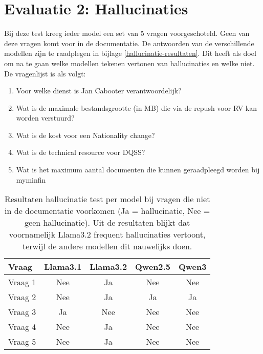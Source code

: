 \section{Evaluatie 2: Hallucinaties}

Bij deze test kreeg ieder model een set van 5 vragen voorgeschoteld. Geen van deze vragen komt voor in de documentatie. De antwoorden van de verschillende modellen zijn te raadplegen in bijlage \ref{hallucinatie-resultaten}. Dit heeft als doel om na te gaan welke modellen tekenen vertonen van hallucinaties en welke niet. 
\\[1em]
De vragenlijst is als volgt:

\begin{enumerate}
    \item Voor welke dienst is Jan Cabooter verantwoordelijk?
    \item Wat is de maximale bestandsgrootte (in MB) die via de repush voor RV kan worden verstuurd?
    \item Wat is de kost voor een Nationality change?
    \item Wat is de technical resource voor DQSS?
    \item Wat is het maximum aantal documenten die kunnen geraadpleegd worden bij myminfin
\end{enumerate}

\begin{table}[H]
    \begin{tabular}{|l|c|c|c|c|}
        \hline
        \textbf{Vraag} & \textbf{Llama3.1} & \textbf{Llama3.2} & \textbf{Qwen2.5} & \textbf{Qwen3} \\
        \hline
       Vraag 1 & Nee & Ja & Nee & Nee \\
       Vraag 2 & Nee & Ja & Ja & Ja \\
       Vraag 3 & Ja & Nee & Nee & Nee \\
       Vraag 4 & Nee & Ja & Nee & Nee \\
       Vraag 5 & Nee & Ja & Nee & Nee \\
        \hline
    \end{tabular}
    \caption{Resultaten hallucinatie test per model bij vragen die niet in de documentatie voorkomen (Ja = hallucinatie, Nee = geen hallucinatie). Uit de resultaten blijkt dat voornamelijk Llama3.2 frequent hallucinaties vertoont, terwijl de andere modellen dit nauwelijks doen.}
\end{table}

